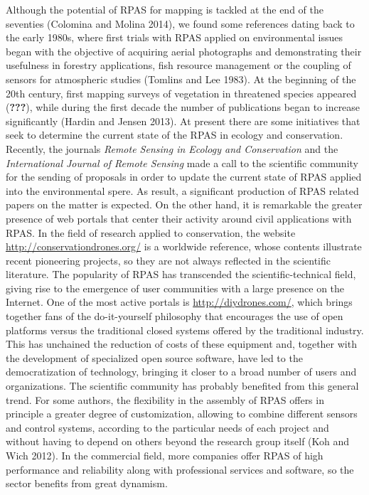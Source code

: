 \documentclass[]{interact}
\theoremstyle{plain}%
\theoremstyle{definition}
\theoremstyle{remark}
\begin{document}
Although the potential of RPAS for mapping is tackled at the end of the
seventies (Colomina and Molina 2014), we found some references dating
back to the early 1980s, where first trials with RPAS applied on
environmental issues began with the objective of acquiring aerial
photographs and demonstrating their usefulness in forestry applications,
fish resource management or the coupling of sensors for atmospheric
studies (Tomlins and Lee 1983). At the beginning of the 20th century,
first mapping surveys of vegetation in threatened species appeared
({\textbf{???}}), while during the first decade the number of
publications began to increase significantly (Hardin and Jensen 2013).
At present there are some initiatives that seek to determine the current
state of the RPAS in ecology and conservation. Recently, the journals
\emph{Remote Sensing in Ecology and Conservation} and the
\emph{International Journal of Remote Sensing} made a call to the
scientific community for the sending of proposals in order to update the
current state of RPAS applied into the environmental spere. As result, a
significant production of RPAS related papers on the matter is expected.
On the other hand, it is remarkable the greater presence of web portals
that center their activity around civil applications with RPAS. In the
field of research applied to conservation, the website
\url{http://conservationdrones.org/} is a worldwide reference, whose
contents illustrate recent pioneering projects, so they are not always
reflected in the scientific literature. The popularity of RPAS has
transcended the scientific-technical field, giving rise to the emergence
of user communities with a large presence on the Internet. One of the
most active portals is \url{http://diydrones.com/}, which brings
together fans of the do-it-yourself philosophy that encourages the use
of open platforms versus the traditional closed systems offered by the
traditional industry. This has unchained the reduction of costs of these
equipment and, together with the development of specialized open source
software, have led to the democratization of technology, bringing it
closer to a broad number of users and organizations. The scientific
community has probably benefited from this general trend. For some
authors, the flexibility in the assembly of RPAS offers in principle a
greater degree of customization, allowing to combine different sensors
and control systems, according to the particular needs of each project
and without having to depend on others beyond the research group itself
(Koh and Wich 2012). In the commercial field, more companies offer RPAS
of high performance and reliability along with professional services and
software, so the sector benefits from great dynamism.
\end{document}
